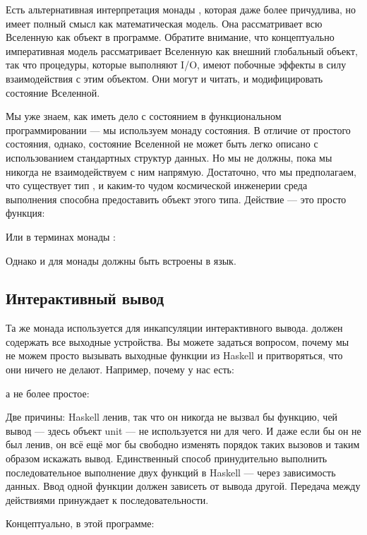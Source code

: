 Есть альтернативная интерпретация монады , которая
даже более причудлива, но имеет полный смысл как математическая модель. Она
рассматривает всю Вселенную как объект в программе. Обратите внимание, что
концептуально императивная модель рассматривает Вселенную как внешний
глобальный объект, так что процедуры, которые выполняют I/O, имеют побочные эффекты в силу
взаимодействия с этим объектом. Они могут и читать, и модифицировать
состояние Вселенной.

Мы уже знаем, как иметь дело с состоянием в функциональном программировании --- мы
используем монаду состояния. В отличие от простого состояния, однако, состояние
Вселенной не может быть легко описано с использованием стандартных структур данных. Но
мы не должны, пока мы никогда не взаимодействуем с ним напрямую. Достаточно,
что мы предполагаем, что существует тип , и
каким-то чудом космической инженерии среда выполнения способна предоставить
объект этого типа. Действие  --- это просто функция:

Или в терминах монады :

Однако \code{>=>} и  для
монады  должны быть встроены в язык.

\subsection{Интерактивный вывод}

Та же монада  используется для инкапсуляции интерактивного вывода.
 должен содержать все выходные устройства. Вы можете
задаться вопросом, почему мы не можем просто вызывать выходные функции из Haskell и притворяться,
что они ничего не делают. Например, почему у нас есть:

а не более простое:

Две причины: Haskell ленив, так что он никогда не вызвал бы функцию, чей
вывод --- здесь объект unit --- не используется ни для чего. И даже
если бы он не был ленив, он всё ещё мог бы свободно изменять порядок таких вызовов
и таким образом искажать вывод. Единственный способ принудительно выполнить последовательное выполнение
двух функций в Haskell --- через зависимость данных. Ввод одной
функции должен зависеть от вывода другой. Передача 
между действиями  принуждает к последовательности.

Концептуально, в этой программе:

